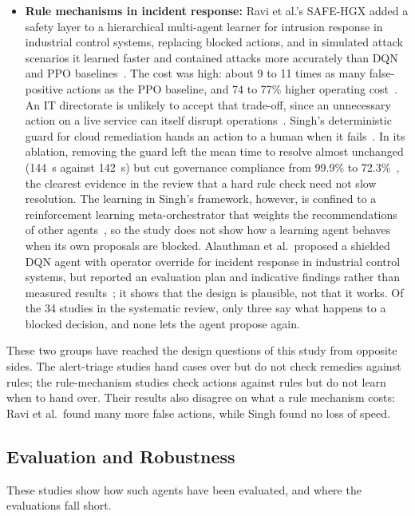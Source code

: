 \begin{itemize}
\item \textbf{Rule mechanisms in incident response:} Ravi et al.'s SAFE-HGX added a safety layer to a hierarchical multi-agent learner for intrusion response in industrial control systems, replacing blocked actions, and in simulated attack scenarios it learned faster and contained attacks more accurately than DQN and PPO baselines~\cite{ravi2025}. The cost was high: about 9 to 11 times as many false-positive actions as the PPO baseline, and 74 to 77\% higher operating cost~\cite{ravi2025}. An IT directorate is unlikely to accept that trade-off, since an unnecessary action on a live service can itself disrupt operations~\cite{okafor2026}. Singh's deterministic guard for cloud remediation hands an action to a human when it fails~\cite{singh2026}. In its ablation, removing the guard left the mean time to resolve almost unchanged (144~s against 142~s) but cut governance compliance from 99.9\% to 72.3\%~\cite{singh2026}, the clearest evidence in the review that a hard rule check need not slow resolution. The learning in Singh's framework, however, is confined to a reinforcement learning meta-orchestrator that weights the recommendations of other agents~\cite{singh2026}, so the study does not show how a learning agent behaves when its own proposals are blocked. Alauthman et al.\ proposed a shielded DQN agent with operator override for incident response in industrial control systems, but reported an evaluation plan and indicative findings rather than measured results~\cite{alauthman2026}; it shows that the design is plausible, not that it works. Of the 34 studies in the systematic review, only three say what happens to a blocked decision, and none lets the agent propose again.
\end{itemize}

These two groups have reached the design questions of this study from opposite sides. The alert-triage studies hand cases over but do not check remedies against rules; the rule-mechanism studies check actions against rules but do not learn when to hand over. Their results also disagree on what a rule mechanism costs: Ravi et al.\ found many more false actions, while Singh found no loss of speed.

\subsection{Evaluation and Robustness}

These studies show how such agents have been evaluated, and where the evaluations fall short.


